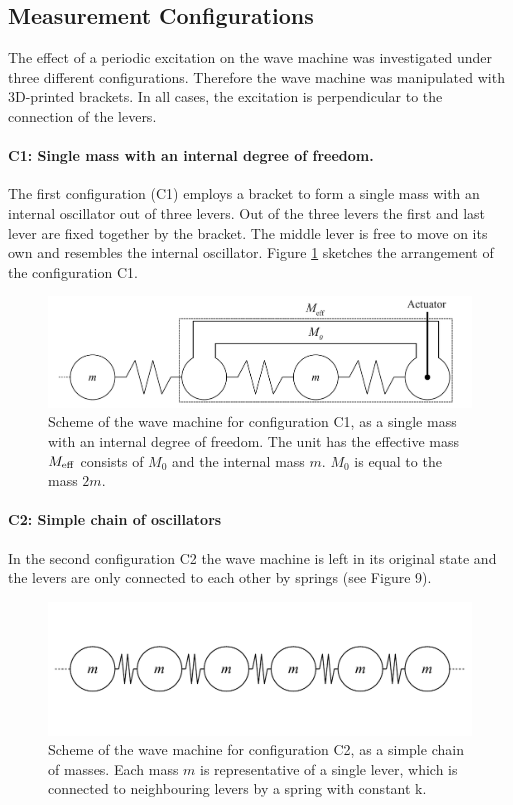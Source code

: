 \documentclass[12pt]{article}
\begin{document}
\subsection{Measurement Configurations}
The effect of a periodic excitation on the wave machine was investigated under three different configurations. Therefore the wave machine was manipulated with 3D-printed brackets. In all cases, the excitation is perpendicular to the connection of the levers.

\paragraph{C1: Single mass with an internal degree of freedom.} The first configuration (C1) employs a bracket to form a single mass with an internal oscillator out of three levers. Out of the three levers the first and last lever are fixed together by the bracket. The middle lever is free to move on its own and resembles the internal oscillator. Figure \ref{fig:figure9} sketches the arrangement of the configuration C1.
\begin{figure}[hbt]	
  \includegraphics[width=.7\columnwidth]{configurations/condition3.pdf}
  \caption{Scheme of the wave machine for configuration C1, as a single mass with an internal degree of freedom. The unit has the effective mass $M_{\rm eff}$ consists of $M_0$ and the internal mass $m$. $M_0$ is equal to the mass $2m$.}\label{fig:figure9}
\end{figure}
\paragraph{C2: Simple chain of oscillators}In the second configuration C2 the wave machine is left in its original state and the levers are only connected to each other by springs (see Figure 9).
\begin{figure}[h!]	
  \includegraphics[width=.7\columnwidth]{configurations/condition1.pdf}
  \caption{Scheme of the wave machine for configuration C2, as a simple chain of masses. Each mass $m$ is representative of a single lever, which is connected to neighbouring levers by a spring with constant k.}
\end{figure}
\end{document}
